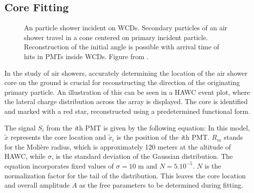 \subsection{Core Fitting} \label{sec:hawc_core_fitting}

\begin{figure}[h!]
    \caption{An particle shower incident on WCDs. Secondary particles of an air shower travel in a cone centered on primary incident particle. Reconstruction of the initial angle is possible with arrival time of hits in PMTs inside WCDs. Figure from \cite{thesis_Zigg}.}
    \label{fig:shower_shape}
\end{figure}

In the study of air showers, accurately determining the location of the air shower core on the ground is crucial for reconstructing the direction of the originating primary particle.
An illustration of this can be seen in a HAWC event plot, where the lateral charge distribution across the array is displayed.
The core is identified and marked with a red star, reconstructed using a predetermined functional form.

The signal $S_i$ from the \textit{i}th PMT is given by the following equation:
\showercore
In this model, $\tilde{x}$ represents the core location and $\tilde{x}_i$ is the position of the \textit{i}th PMT.
$R_m$ stands for the Molière radius, which is approximately 120 meters at the altitude of HAWC, while $\sigma$, is the standard deviation of the Gaussian distribution.
The equation incorporates fixed values of $\sigma = 10$ m and $N=5.10^{-5}$.
$N$ is the normalization factor for the tail of the distribution.
This leaves the core location and overall amplitude $A$ as the free parameters to be determined during fitting.

